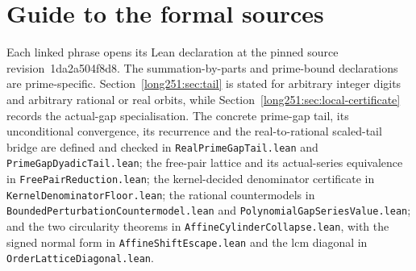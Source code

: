 \documentclass[11pt]{article}
\renewcommand{\commitshort}{1da2a504f8d8}
\begin{document}
\section{Guide to the formal sources}\label{long251:app:index}

Each linked phrase opens its Lean declaration at the pinned source
revision~\commitshort.  The summation-by-parts and prime-bound declarations
are prime-specific.  Section~\ref{long251:sec:tail} is stated for arbitrary integer
digits and arbitrary rational or real orbits, while
Section~\ref{long251:sec:local-certificate} records the actual-gap specialisation.  The
concrete prime-gap tail, its unconditional convergence, its recurrence and the
real-to-rational scaled-tail bridge are defined and checked in
\texttt{RealPrimeGapTail.lean} and \texttt{PrimeGapDyadicTail.lean}; the
free-pair lattice and its actual-series equivalence in
\texttt{FreePairReduction.lean}; the kernel-decided denominator certificate in
\texttt{KernelDenominatorFloor.lean}; the rational countermodels in
\texttt{BoundedPerturbationCountermodel.lean} and
\texttt{PolynomialGapSeriesValue.lean}; and the two circularity theorems in
\texttt{AffineCylinderCollapse.lean}, with the signed normal form in
\texttt{AffineShiftEscape.lean} and the lcm diagonal in
\texttt{OrderLatticeDiagonal.lean}.

\iffalse
\end{document}
